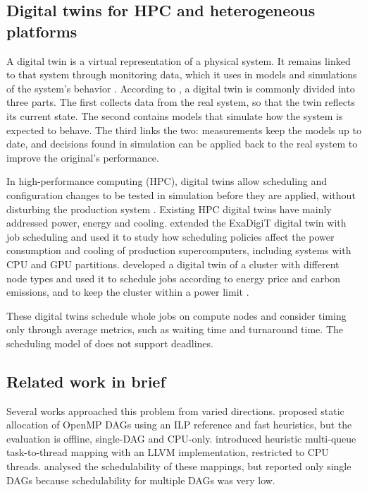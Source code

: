 \subsection{Digital twins for HPC and heterogeneous platforms}
\label{sec:chap1_digital_twins}

A digital twin is a virtual representation of a physical system. It remains linked to that system through monitoring data, which it uses in models and simulations of the system's behavior \parencite{Maiterth2025SRAPS,Kammeyer2025Thesis}. According to \textcite{Kammeyer2025Thesis}, a digital twin is commonly divided into three parts. The first collects data from the real system, so that the twin reflects its current state. The second contains models that simulate how the system is expected to behave. The third links the two: measurements keep the models up to date, and decisions found in simulation can be applied back to the real system to improve the original's performance.

In high-performance computing (HPC), digital twins allow scheduling and configuration changes to be tested in simulation before they are applied, without disturbing the production system \parencite{Maiterth2025SRAPS,Kammeyer2025DTMeasure}. Existing HPC digital twins have mainly addressed power, energy and cooling. \textcite{Maiterth2025SRAPS} extended the ExaDigiT digital twin with job scheduling and used it to study how scheduling policies affect the power consumption and cooling of production supercomputers, including systems with CPU and GPU partitions. \textcite{Kammeyer2025Thesis} developed a digital twin of a cluster with different node types and used it to schedule jobs according to energy price and carbon emissions, and to keep the cluster within a power limit \parencite{Kammeyer2023DTFramework,Kammeyer2025DTMeasure}.

These digital twins schedule whole jobs on compute nodes and consider timing only through average metrics, such as waiting time and turnaround time. The scheduling model of \textcite{Kammeyer2025Thesis} does not support deadlines. 

\subsection{Related work in brief}
\label{sec:chap1_related_brief}

Several works approached this problem from varied directions. \textcite{Melani2017StaticOpenMP} proposed static allocation of OpenMP DAGs using an ILP reference and fast heuristics, but the evaluation is offline, single-DAG and CPU-only. \textcite{Samadi2024TaskToThread} introduced heuristic multi-queue task-to-thread mapping with an LLVM implementation, restricted to CPU threads. \textcite{Samadi2026Schedulability} analysed the schedulability of these mappings, but reported only single DAGs because schedulability for multiple DAGs was very low.

